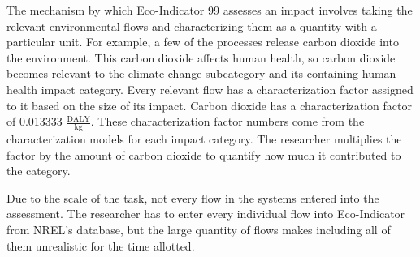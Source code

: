 \documentclass[final,journal,10pt,letterpaper,oneside,twocolumn,compsoc]%
{IEEEtran}
\begin{document}
The mechanism by which Eco-Indicator 99 assesses an impact involves taking the
relevant environmental flows and characterizing them as a quantity with a
particular unit. For
example, a few of the processes release carbon dioxide into the environment.
This
carbon dioxide affects human health, so carbon dioxide becomes relevant to the
climate change subcategory and its containing human health impact category.
Every relevant flow has a
characterization factor assigned to it based on the size of its impact. Carbon dioxide has
a characterization factor of 0.013333 $\frac{\textrm{DALY}}{\textrm{kg}}$.
These
characterization factor numbers come from the characterization models for each
impact category.
The researcher multiplies the factor by the
amount of carbon dioxide to
quantify how much it contributed to the category. 

Due to the scale of the task, not every flow in the systems entered into the
assessment. The researcher has to enter every individual flow into
Eco-Indicator from NREL's database, but the large quantity of flows makes
including all of them unrealistic for the time allotted.
\end{document}

